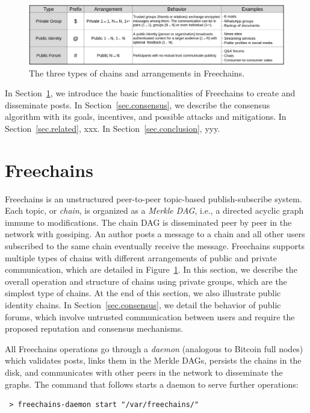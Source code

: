 \documentclass[10pt,journal,compsoc]{IEEEtran}
\newcommand{\FC}        {Freechains\xspace}
\begin{document}
\begin{figure}[ht]
\centering
\includegraphics[width=\textwidth]{arrangements.png}
\caption{The three types of chains and arrangements in \FC.}
\label{fig.table}
\end{figure}

In Section~\ref{sec.freechains}, we introduce the basic functionalities of \FC
to create and disseminate posts.
In Section~\ref{sec.consensus}, we describe the consensus algorithm with its
goals, incentives, and possible attacks and mitigations.
In Section~\ref{sec.related}, xxx.
In Section~\ref{sec.conclusion}, yyy.

\section{Freechains}
\label{sec.freechains}

\FC is an unstructured peer-to-peer topic-based publish-subscribe system.
Each topic, or \emph{chain}, is organized as a \emph{Merkle DAG}, i.e., a
directed acyclic graph immune to modifications.
The chain DAG is disseminated peer by peer in the network with gossiping.
An author posts a message to a chain and all other users subscribed to the same
chain eventually receive the message.
\FC supports multiple types of chains with different arrangements of public and
private communication, which are detailed in Figure~\ref{fig.table}.
In this section, we describe the overall operation and structure of chains
using private groups, which are the simplest type of chains.
At the end of this section, we also illustrate public identity chains.
In Section~\ref{sec.consensus}, we detail the behavior of public forums, which
involve untrusted communication between users and require the proposed
reputation and consensus mechanisms.

All \FC operations go through a \emph{daemon} (analogous to Bitcoin full nodes)
which validates posts, links them in the Merkle DAGs, persists the chains in
the disk, and communicates with other peers in the network to disseminate the
graphs.
The command that follows starts a daemon to serve further operations:

{\footnotesize
\begin{verbatim}
 > freechains-daemon start "/var/freechains/"
\end{verbatim}
}
\end{document}
